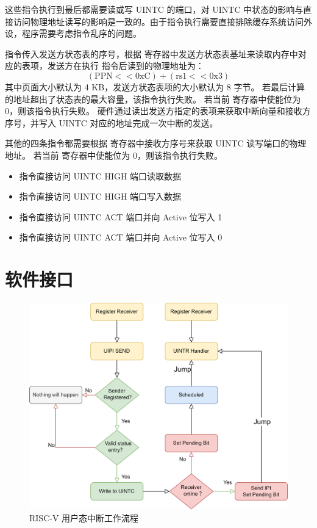 这些指令执行到最后都需要读或写 UINTC 的端口，对 UINTC 中状态的影响与直接访问物理地址读写的影响是一致的。由于指令执行需要直接排除缓存系统访问外设，程序需要考虑指令乱序的问题。

\Iuipisend 指令传入发送方状态表的序号，根据 \Rsuist 寄存器中发送方状态表基址来读取内存中对应的表项，发送方在执行 \Iuipisend 指令后读到的物理地址为：
$$
\mathrm{( PPN << 0xC ) + ( rs1 << 0x3 )}
$$
其中页面大小默认为 4 KB，发送方状态表项的大小默认为 8 字节。
若最后计算的地址超出了状态表的最大容量，该指令执行失败。
若当前 \Rsuist 寄存器中使能位为 0，则该指令执行失败。
硬件通过读出发送方指定的表项来获取中断向量和接收方序号，并写入 UINTC 对应的地址完成一次中断的发送。

其他的四条指令都需要根据 \Rsuirs 寄存器中接收方序号来获取 UINTC 读写端口的物理地址。
若当前 \Rsuirs 寄存器中使能位为 0，则该指令执行失败。

\begin{itemize}
    \item \Iuipiread 指令直接访问 UINTC HIGH 端口读取数据
    \item \Iuipiwrite 指令直接访问 UINTC HIGH 端口写入数据
    \item \Iuipiact 指令直接访问 UINTC ACT 端口并向 Active 位写入 1
    \item \Iuipideact 指令直接访问 UINTC ACT 端口并向 Active 位写入 0
\end{itemize}

\section{软件接口}

\begin{figure}
    \centering
    \includegraphics[width=0.8\linewidth]{figures/uintr2.png}
    \caption{RISC-V 用户态中断工作流程}
    \label{fig:uintr2}
\end{figure}

